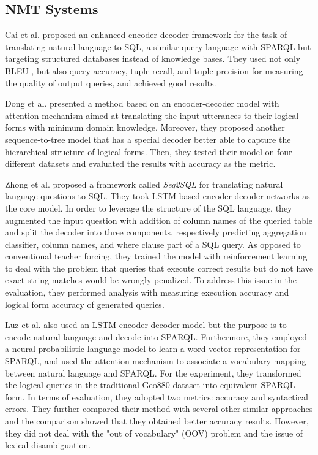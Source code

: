 \subsection{NMT Systems} \label{subsection:related work with nmt}

Cai et al. \cite{Cai2017} proposed an enhanced encoder-decoder framework for the task of translating natural language to SQL, a similar query language with SPARQL but targeting structured databases instead of knowledge bases. They used not only BLEU \cite{Papineni2002}, but also query accuracy, tuple recall, and tuple precision for measuring the quality of output queries, and achieved good results.

Dong et al. \cite{dong2016language} presented a method based on an encoder-decoder model with attention mechanism aimed at translating the input utterances to their logical forms with minimum domain knowledge. Moreover, they proposed another sequence-to-tree model that has a special decoder better able to capture the hierarchical structure of logical forms. Then, they tested their model on four different datasets and evaluated the results with accuracy as the metric.

Zhong et al. \cite{DBLP:journals/corr/abs-1709-00103} proposed a framework called \textit{Seq2SQL} for translating natural language questions to SQL. They took LSTM-based encoder-decoder networks as the core model. In order to leverage the structure of the SQL language, they augmented the input question with addition of column names of the queried table and split the decoder into three components, respectively predicting aggregation classifier, column names, and where clause part of a SQL query. As opposed to conventional teacher forcing, they trained the model with reinforcement learning to deal with the problem that queries that execute correct results but do not have exact string matches would be wrongly penalized. To address this issue in the evaluation, they performed analysis with measuring execution accuracy and logical form accuracy of generated queries.

Luz et al. \cite{Luz2018} also used an LSTM encoder-decoder model but the purpose is to encode natural language and decode into SPARQL. Furthermore, they employed a neural probabilistic language model to learn a word vector representation for SPARQL, and used the attention mechanism to associate a vocabulary mapping between natural language and SPARQL. For the experiment, they transformed the logical queries in the traditional Geo880 dataset into equivalent SPARQL form. In terms of evaluation, they adopted two metrics: accuracy and syntactical errors. They further compared their method with several other similar approaches \cite{alagha2015using,Kaufmann06querix:a} and the comparison showed that they obtained better accuracy results. However, they did not deal with the "out of vocabulary" (OOV) problem and the issue of lexical disambiguation.

